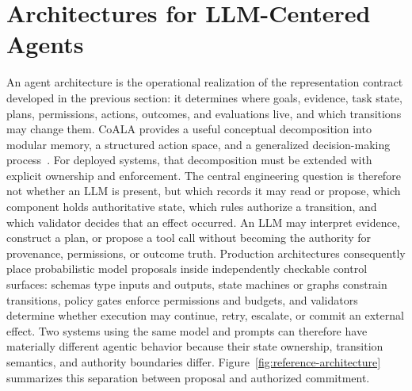 \section{Architectures for LLM-Centered Agents}
\label{sec:architecture}

An agent architecture is the operational realization of the representation contract developed in the previous section: it determines where goals, evidence, task state, plans, permissions, actions, outcomes, and evaluations live, and which transitions may change them. CoALA provides a useful conceptual decomposition into modular memory, a structured action space, and a generalized decision-making process~\cite{sumers2024coala}. For deployed systems, that decomposition must be extended with explicit ownership and enforcement. The central engineering question is therefore not whether an LLM is present, but which records it may read or propose, which component holds authoritative state, which rules authorize a transition, and which validator decides that an effect occurred. An LLM may interpret evidence, construct a plan, or propose a tool call without becoming the authority for provenance, permissions, or outcome truth. Production architectures consequently place probabilistic model proposals inside independently checkable control surfaces: schemas type inputs and outputs, state machines or graphs constrain transitions, policy gates enforce permissions and budgets, and validators determine whether execution may continue, retry, escalate, or commit an external effect. Two systems using the same model and prompts can therefore have materially different agentic behavior because their state ownership, transition semantics, and authority boundaries differ. Figure~\ref{fig:reference-architecture} summarizes this separation between proposal and authorized commitment.

